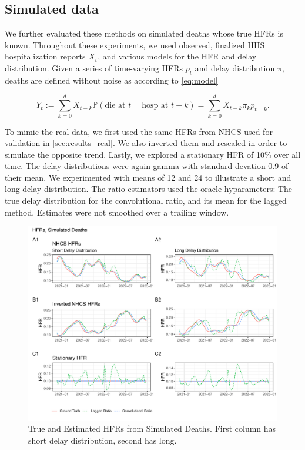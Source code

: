 \documentclass{article}
\begin{document}
\subsection{Simulated data}


We further evaluated these methods on simulated deaths whose true HFRs is known. Throughout these experiments, we used observed, finalized HHS hospitalization reports $X_t$, and various models for the HFR and delay distribution. Given a series of time-varying HFRs $p_t$ and delay distribution $\pi$, deaths are defined without noise as according to \ref{eq:model}

$$Y_t := \sum_{k=0}^d X_{t-k} \mathbb{P}(\text{die at $t$ }\vert\text{ hosp at }t-k) = \sum_{k=0}^d X_{t-k} \pi_k p_{t-k}.$$

To mimic the real data, we first used the same HFRs from NHCS used for validation in \ref{sec:results_real}. We also inverted them and rescaled in order to simulate the opposite trend. Lastly, we explored a stationary HFR of 10\% over all time. The delay distributions were again gamma with standard devation 0.9 of their mean. We experimented with means of 12 and 24 to illustrate a short and long delay distribution. The ratio estimators used the oracle hyparameters: The true delay distribution for the convolutional ratio, and its mean for the lagged method. Estimates were not smoothed over a trailing window.

\begin{figure}
    \centering
    \includegraphics[width=\linewidth]{Figs/Simulated/simulated_results.pdf}
    \caption{True and Estimated HFRs from Simulated Deaths. First column has short delay distribution, second has long.}
    \label{fig:sims}
\end{figure}
\end{document}
